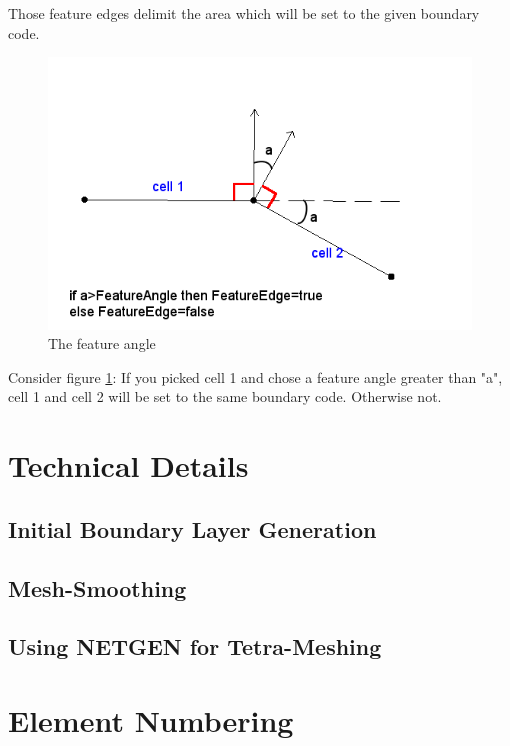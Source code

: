 \documentclass[10pt,a4paper,british]{book}
\begin{document}
Those feature edges delimit the area which will be set to the given boundary code.

\begin{figure}
  \begin{centering}
    \includegraphics[width=14cm]{figures/featureangle4}
    \par
  \end{centering}
  \caption{The feature angle}
  \label{fig:featureangle4}
\end{figure}

Consider figure \ref{fig:featureangle4}: If you picked cell 1 and chose a feature angle greater than "a", cell 1 and cell 2 will be set to the same boundary code. Otherwise not.

\section{Technical Details}

\subsection{Initial Boundary Layer Generation}

\subsection{Mesh-Smoothing}

\subsection{Using NETGEN for Tetra-Meshing}


\section{Element Numbering}
\end{document}
